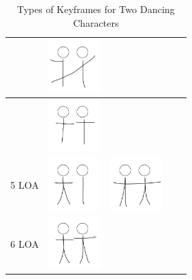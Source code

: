 {\begin{table}[!htb]
\begin{tabular}{ | c | c || c | c | c | }
\begin{minipage}{.15\textwidth}
    \end{minipage} 
    & 
    \begin{minipage}{.15\textwidth}
      \includegraphics[width=\linewidth, height=20mm]{img/09keyframe}
    \end{minipage} 
    \\ \hline 
    &
    \begin{minipage}{.15\textwidth}
      \includegraphics[width=\linewidth, height=20mm]{img/4-1loa_separate_keyframe}
    \end{minipage}
    & & & 
    \\ \hline
    5 LOA 
    &
    \begin{minipage}{.15\textwidth}
      \includegraphics[width=\linewidth, height=20mm]{img/5loa_separate_keyframe}
    \end{minipage}
    &
    \begin{minipage}{.15\textwidth}
      \includegraphics[width=\linewidth, height=20mm]{img/10keyframe}
    \end{minipage} & & 
    \\ \hline
    6 LOA 
    &
    \begin{minipage}{.15\textwidth}
      \includegraphics[width=\linewidth, height=20mm]{img/6loa_separate_keyframe}
    \end{minipage}
    & & & 
    \\ \hline
  \end{tabular}
  \caption{Types of Keyframes for Two Dancing Characters}
  \label{table:LOAChart}
\end{table}
}


